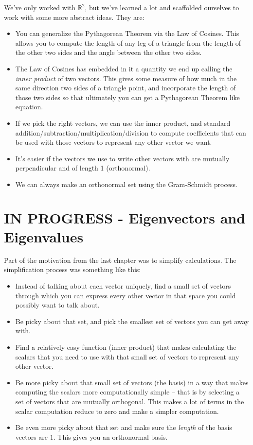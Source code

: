\documentclass[
]{book}
\providecommand{\tightlist}{%
  \setlength{\itemsep}{0pt}\setlength{\parskip}{0pt}}
\begin{document}
We've only worked with \(\mathbb{R}^2\), but we've learned a lot and scaffolded ourselves to work with some more abstract ideas. They are:

\begin{itemize}
\tightlist
\item
  You can generalize the Pythagorean Theorem via the Law of Cosines. This allows you to compute the length of any leg of a triangle from the length of the other two sides and the angle between the other two sides.
\item
  The Law of Cosines has embedded in it a quantity we end up calling the \emph{inner product} of two vectors. This gives some measure of how much in the same direction two sides of a triangle point, and incorporate the length of those two sides so that ultimately you can get a Pythagorean Theorem like equation.
\item
  If we pick the right vectors, we can use the inner product, and standard addition/subtraction/multiplication/division to compute coefficients that can be used with those vectors to represent any other vector we want.
\item
  It's easier if the vectors we use to write other vectors with are mutually perpendicular and of length 1 (orthonormal).
\item
  We can always make an orthonormal set using the Gram-Schmidt process.
\end{itemize}

\hypertarget{in-progress---eigenvectors-and-eigenvalues}{%
\chapter{IN PROGRESS - Eigenvectors and Eigenvalues}\label{in-progress---eigenvectors-and-eigenvalues}}

Part of the motivation from the last chapter was to simplify calculations. The simplification process was something like this:

\begin{itemize}
\tightlist
\item
  Instead of talking about each vector uniquely, find a small set of vectors through which you can express every other vector in that space you could possibly want to talk about.
\item
  Be picky about that set, and pick the smallest set of vectors you can get away with.
\item
  Find a relatively easy function (inner product) that makes calculating the scalars that you need to use with that small set of vectors to represent any other vector.
\item
  Be more picky about that small set of vectors (the basis) in a way that makes computing the scalars more computationally simple -- that is by selecting a set of vectors that are mutually orthogonal. This makes a lot of terms in the scalar computation reduce to zero and make a simpler computation.
\item
  Be even more picky about that set and make sure the \emph{length} of the basis vectors are \(1\). This gives you an orthonormal basis.
\end{itemize}
\end{document}
